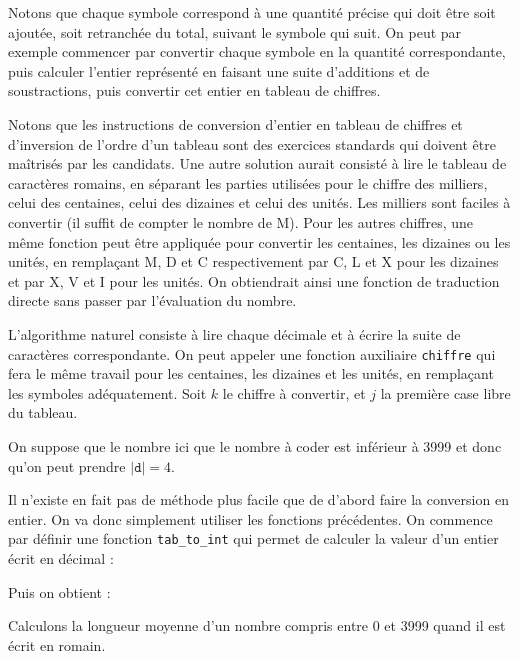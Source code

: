 \Q
Notons que chaque symbole correspond à une quantité précise qui doit être soit ajoutée, soit retranchée du total, suivant le symbole qui suit. On peut par exemple commencer par convertir chaque symbole en la quantité correspondante, puis calculer l'entier représenté en faisant une suite d'additions et de soustractions, puis convertir cet entier en tableau de chiffres.



Notons que les instructions de conversion d'entier en tableau de chiffres et d'inversion de l'ordre d'un tableau sont des exercices standards qui doivent être maîtrisés par les candidats. Une autre solution aurait consisté à lire le tableau de caractères romains, en séparant les parties utilisées pour le chiffre des milliers, celui des centaines, celui des dizaines et celui des unités. Les milliers sont faciles à convertir (il suffit de compter le nombre de M). Pour les autres chiffres, une même fonction peut être appliquée pour convertir les centaines, les dizaines ou les unités, en remplaçant M, D et C respectivement par C, L et X pour les dizaines et par X, V et I pour les unités. On obtiendrait ainsi une fonction de traduction directe sans passer par l'évaluation du nombre.

\Q
L'algorithme naturel consiste à lire chaque décimale et à écrire la suite de caractères correspondante. On peut appeler une fonction auxiliaire \texttt{chiffre} qui fera le même travail pour les centaines, les dizaines et les unités, en remplaçant les symboles adéquatement. Soit $k$ le chiffre à convertir, et $j$ la première case libre du tableau.
\medskip

On suppose que le nombre ici que le nombre à coder est inférieur à 3999 et donc qu'on peut prendre $|\texttt{d}| = 4$.



\Q
Il n'existe en fait pas de méthode plus facile que de d'abord faire la conversion en entier. On va donc simplement utiliser les fonctions précédentes. On commence par définir une fonction \texttt{tab\_to\_int} qui permet de calculer la valeur d'un entier écrit en décimal :



Puis on obtient :



\Q
Calculons la longueur moyenne d'un nombre compris entre 0 et 3999 quand il est écrit en romain.
\medskip

